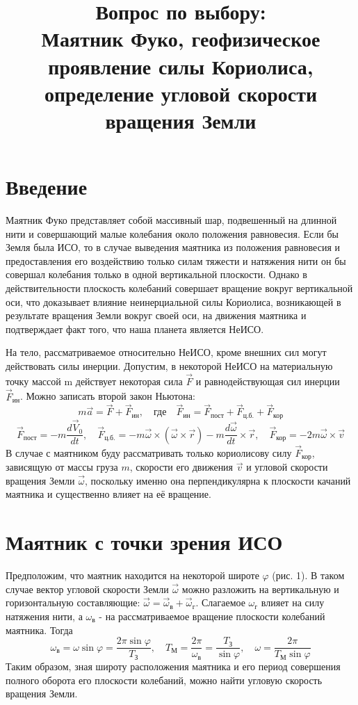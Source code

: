 \documentclass[a4paper, 10pt]{article}%
\begin{document}
\date{}
\author{}
\title{Вопрос по выбору:\\
Маятник Фуко, геофизическое проявление силы Кориолиса, определение угловой скорости вращения Земли}
\maketitle
\large
\section*{Введение}
Маятник Фуко представляет собой массивный шар, подвешенный на длинной нити и совершающий малые колебания около положения равновесия. Если бы Земля была ИСО, то в случае выведения маятника из положения равновесия и предоставления его воздействию только силам тяжести и натяжения нити он бы совершал колебания только в одной вертикальной плоскости. Однако в действительности плоскость колебаний совершает вращение вокруг вертикальной оси, что доказывает влияние неинерциальной силы Кориолиса, возникающей в результате вращения Земли вокруг своей оси, на движения маятника и подтверждает факт того, что наша планета является НеИСО.


На тело, рассматриваемое относительно НеИСО, кроме внешних сил могут действовать силы инерции. Допустим, в некоторой НеИСО на материальную точку массой m действует некоторая сила $\vec{F}$ и равнодействующая сил инерции $\vec{F}_{\text{ин}}$. Можно записать второй закон Ньютона:
\[ m\vec{a} = \vec{F} + \vec{F}_{\text{ин}}, \quad \text{где} \quad \vec{F}_{\text{ин}} = \vec{F}_{\text{пост}} + \vec{F}_{\text{ц.б.}} + \vec{F}_{\text{кор}}  \]
\[ \vec{F}_{\text{пост}} =  - m\frac{d\vec{V}_{0}}{dt}, \quad \vec{F}_{\text{ц.б.}} = -m\vec{\omega}\times \left({\vec{\omega}\times\vec{r}}\right) - m\frac{d\vec{\omega}}{dt}\times\vec{r}, \quad \vec{F}_{\text{кор}} = -2m\vec{\omega}\times\vec{v}\]
В случае с маятником буду рассматривать только кориолисову силу $\vec{F}_{\text{кор}}$, зависящую от массы груза $m$, скорости его движения $\vec{v}$ и угловой скорости вращения Земли $\vec{\omega}$, поскольку именно она перпендикулярна к плоскости качаний маятника и существенно влияет на её вращение.

\section*{Маятник с точки зрения ИСО}
Предположим, что маятник находится на некоторой широте $\varphi$ (рис. 1). В таком случае вектор угловой скорости Земли $\vec{\omega}$ можно разложить на вертикальную и горизонтальную составляющие: $\vec{\omega} = \vec{\omega}_{\text{в}} + \vec{\omega}_{\text{г}}$.
Слагаемое $\omega_{\text{г}}$ влияет на силу натяжения нити, а $\omega_{\text{в}}$ - на рассматриваемое вращение плоскости колебаний маятника. Тогда 
\[ \omega_{\text{в}} = \omega\sin \varphi = \frac{2\pi\sin \varphi}{T_{\text{З}}}, \quad T_{\text{М}} = \frac{2\pi}{\omega_{\text{в}}} = \frac{T_{\text{З}}}{\sin \varphi}, \quad \omega = \frac{2\pi}{T_{\text{М}}\sin \varphi}\]
Таким образом, зная широту расположения маятника и его период совершения полного оборота его плоскости колебаний, можно найти угловую скорость вращения Земли.
\end{document}
